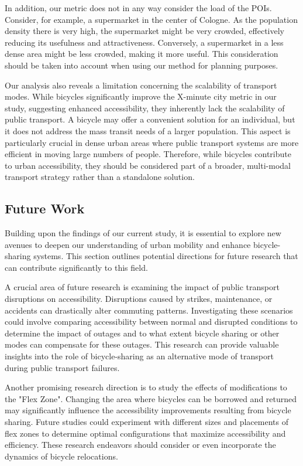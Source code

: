 In addition, our metric does not in any way consider the load of the POIs.
Consider, for example, a supermarket in the center of Cologne.
As the population density there is very high, the supermarket might be very crowded, effectively reducing its usefulness and attractiveness.
Conversely, a supermarket in a less dense area might be less crowded, making it more useful.
This consideration should be taken into account when using our method for planning purposes.

Our analysis also reveals a limitation concerning the scalability of transport modes. 
While bicycles significantly improve the X-minute city metric in our study, suggesting enhanced accessibility, they inherently lack the scalability of public transport. 
A bicycle may offer a convenient solution for an individual, but it does not address the mass transit needs of a larger population. 
This aspect is particularly crucial in dense urban areas where public transport systems are more efficient in moving large numbers of people. 
Therefore, while bicycles contribute to urban accessibility, they should be considered part of a broader, multi-modal transport strategy rather than a standalone solution.


\subsection{Future Work}
\label{sec:future_work}

Building upon the findings of our current study, it is essential to explore new avenues to deepen our understanding of urban mobility and enhance bicycle-sharing systems. 
This section outlines potential directions for future research that can contribute significantly to this field.

A crucial area of future research is examining the impact of public transport disruptions on accessibility.
Disruptions caused by strikes, maintenance, or accidents can drastically alter commuting patterns. 
Investigating these scenarios could involve comparing accessibility between normal and disrupted conditions to determine the impact of outages and to what extent bicycle sharing or other modes can compensate for these outages.
This research can provide valuable insights into the role of bicycle-sharing as an alternative mode of transport during public transport failures.

Another promising research direction is to study the effects of modifications to the "Flex Zone".
Changing the area where bicycles can be borrowed and returned may significantly influence the accessibility improvements resulting from bicycle sharing. 
Future studies could experiment with different sizes and placements of flex zones to determine optimal configurations that maximize accessibility and efficiency.
These research endeavors should consider or even incorporate the dynamics of bicycle relocations.

